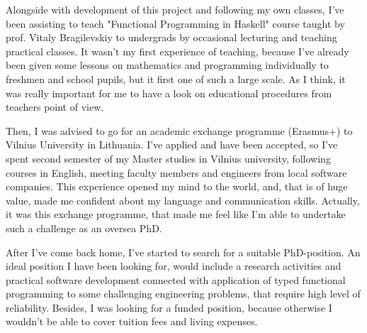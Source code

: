 \documentclass[11pt,a4paper,sans]{moderncv} %
\begin{document}
Alongside with development of this project and following my own classes, 
I've been assisting to teach "Functional Programming in Haskell" course taught 
by prof. Vitaly Bragilevskiy to undergrads by occasional lecturing
and teaching practical classes. It wasn't my first experience of teaching,
because I've already been given some lessons on mathematics and programming 
individually to freshmen and school pupils, but it first one of such a large 
scale. As I think, it was really important for me to have a look on educational 
procedures from teachers point of view.

Then, I was advised to go for an academic exchange programme (Erasmus+) to 
Vilnius University in Lithuania. I've applied and have been accepted, so I've
spent second semester of my Master studies in Vilnius university, following
courses in English, meeting faculty members and engineers from local software
companies. This experience opened my mind to the world, and, that is of huge
value, made me confident about my language and communication skills. Actually, 
it was this exchange programme, that made me feel like I'm able to undertake 
such a challenge as an oversea PhD.

After I've come back home, I've started to search for a suitable PhD-position.
An ideal position I have been looking for, would include a research activities
and practical software development connected with application of typed 
functional programming to some challenging engineering problems, that require
high level of reliability. Besides, I was looking for a funded position, because
otherwise I wouldn't be able to cover tuition fees and living expenses.
\end{document}
